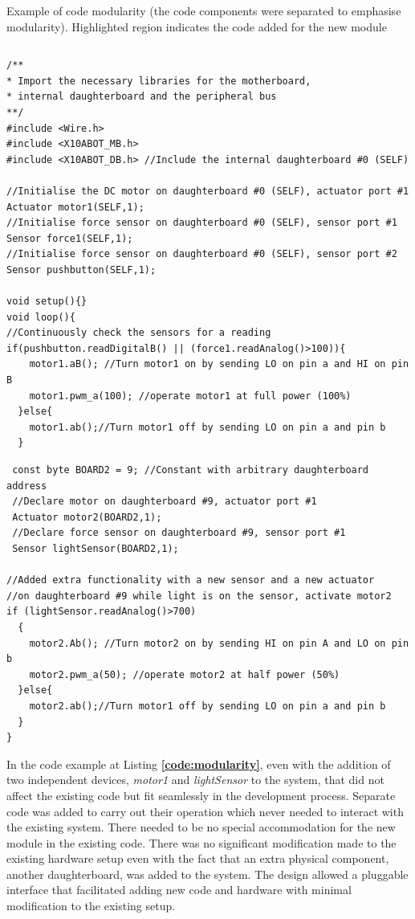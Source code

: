 \begin{listing}
		\footnotesize
        {\fontsize{8}{6}\selectfont
		\caption{Example of code modularity (the code components were separated to emphasise modularity). Highlighted region indicates the code added for the new module} \label{code:modularity}
		\begin{verbatim}
        \end{verbatim}
        \begin{verbatim}
/**
* Import the necessary libraries for the motherboard, 
* internal daughterboard and the peripheral bus
**/
#include <Wire.h>  
#include <X10ABOT_MB.h>
#include <X10ABOT_DB.h> //Include the internal daughterboard #0 (SELF)

//Initialise the DC motor on daughterboard #0 (SELF), actuator port #1
Actuator motor1(SELF,1);
//Initialise force sensor on daughterboard #0 (SELF), sensor port #1
Sensor force1(SELF,1);
//Initialise force sensor on daughterboard #0 (SELF), sensor port #2
Sensor pushbutton(SELF,1);
   
void setup(){}
void loop(){
//Continuously check the sensors for a reading
if(pushbutton.readDigitalB() || (force1.readAnalog()>100)){
    motor1.aB(); //Turn motor1 on by sending LO on pin a and HI on pin B
    motor1.pwm_a(100); //operate motor1 at full power (100%) 
  }else{
    motor1.ab();//Turn motor1 off by sending LO on pin a and pin b
  }
 \end{verbatim}
 \begin{verbatim}
 const byte BOARD2 = 9; //Constant with arbitrary daughterboard address
 //Declare motor on daughterboard #9, actuator port #1
 Actuator motor2(BOARD2,1);
 //Declare force sensor on daughterboard #9, sensor port #1
 Sensor lightSensor(BOARD2,1);
 
//Added extra functionality with a new sensor and a new actuator
//on daughterboard #9 while light is on the sensor, activate motor2
if (lightSensor.readAnalog()>700)
  {
    motor2.Ab(); //Turn motor2 on by sending HI on pin A and LO on pin b
    motor2.pwm_a(50); //operate motor2 at half power (50%)
  }else{
    motor2.ab();//Turn motor1 off by sending LO on pin a and pin b
  }
}	 
	\end{verbatim}
		}
\end{listing}
In the code example at Listing \textbf{\ref{code:modularity}}, even with the addition of two independent devices, \emph{motor1} and \emph{lightSensor} to the system, that did not affect the existing code but fit seamlessly in the development process. Separate code was added to carry out their operation which never needed to interact with the existing system. There needed to be no special accommodation for the new module in the existing code. There was no significant modification made to the existing hardware setup even with the fact that an extra physical component, another daughterboard, was added to the system. The \xten design allowed a pluggable interface that facilitated adding new code and hardware with minimal modification to the existing setup.

